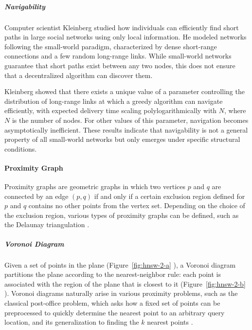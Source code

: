 \subparagraph{Navigability}

Computer scientist Kleinberg studied \cite{Kleinberg-2000-5, Kleinberg-2000-8} how individuals can efficiently find short paths in large social networks using only local information. He modeled networks following the small-world paradigm, characterized by dense short-range connections and a few random long-range links. While small-world networks guarantee that short paths exist between any two nodes, this does not ensure that a decentralized algorithm can discover them.

Kleinberg showed that there exists a unique value of a parameter controlling the distribution of long-range links at which a greedy algorithm can navigate efficiently, with expected delivery time scaling polylogarithmically with $N$, where $N$ is the number of nodes. For other values of this parameter, navigation becomes asymptotically inefficient. These results indicate that navigability is not a general property of all small-world networks but only emerges under specific structural conditions.

\paragraph{Proximity Graph}

Proximity graphs are geometric graphs in which two vertices $p$ and $q$ are connected by an edge $(p, q)$ if and only if a certain exclusion region defined for $p$ and $q$ contains no other points from the vertex set. Depending on the choice of the exclusion region, various types of proximity graphs can be defined, such as the Delaunay triangulation \cite{Mitchell-Mulzer-2017}.

\newpage

\subparagraph{Voronoi Diagram}

Given a set of points in the plane (Figure~\ref{fig:hnsw-2-a} \cite{Moghaddam-Banihashemi-Bakhshoodeh-Mir-Delgado-2023}), a Voronoi diagram partitions the plane according to the nearest-neighbor rule: each point is associated with the region of the plane that is closest to it (Figure~\ref{fig:hnsw-2-b} \cite{Moghaddam-Banihashemi-Bakhshoodeh-Mir-Delgado-2023}). Voronoi diagrams naturally arise in various proximity problems, such as the classical post-office problem, which asks how a fixed set of points can be preprocessed to quickly determine the nearest point to an arbitrary query location, and its generalization to finding the $k$ nearest points \cite{Aurenhammer-1991}.

